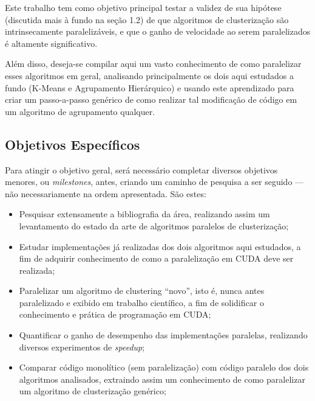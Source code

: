 \documentclass[12pt, %
openright, 
oneside, %
a4paper,    %
brazil]{facom-ufu-abntex2}
\def\qntAlgrtm{dois}
\begin{document}
Este trabalho tem como objetivo principal testar a validez de sua hipótese (discutida mais à fundo na seção 1.2) de que algoritmos de clusterização são intrinsecamente paralelizáveis, e que o ganho de velocidade ao serem paralelizados é altamente significativo.

Além disso, deseja-se compilar aqui um vasto conhecimento de como paralelizar esses algoritmos em geral, analisando principalmente os \qntAlgrtm{} aqui estudados a fundo (K-Means e Agrupamento Hierárquico) e usando este aprendizado para criar um passo-a-passo genérico de como realizar tal modificação de código em um algoritmo de agrupamento qualquer.




\subsection{Objetivos Específicos}


Para atingir o objetivo geral, será necessário completar diversos objetivos menores, ou \textit{milestones}, antes, criando um caminho de pesquisa a ser seguido --- não necessariamente na ordem apresentada. São estes:

\begin{itemize}
    \item Pesquisar extensamente a bibliografia da área, realizando assim um levantamento do estado da arte de algoritmos paralelos de clusterização;
    \item Estudar implementações já realizadas dos \qntAlgrtm{} algoritmos aqui estudados, a fim de adquirir conhecimento de como a paralelização em CUDA deve ser realizada;
    \item Paralelizar um algoritmo de clustering \enquote{novo}, isto é, nunca antes paralelizado e exibido em trabalho científico, a fim de solidificar o conhecimento e prática de programação em CUDA;
    \item Quantificar o ganho de desempenho das implementações paralelas, realizando diversos experimentos de \textit{speedup};
    \item Comparar código monolítico (sem paralelização) com código paralelo dos \qntAlgrtm{} algoritmos analisados, extraindo assim um conhecimento de como paralelizar um algoritmo de clusterização genérico;
\end{itemize}
\end{document}
